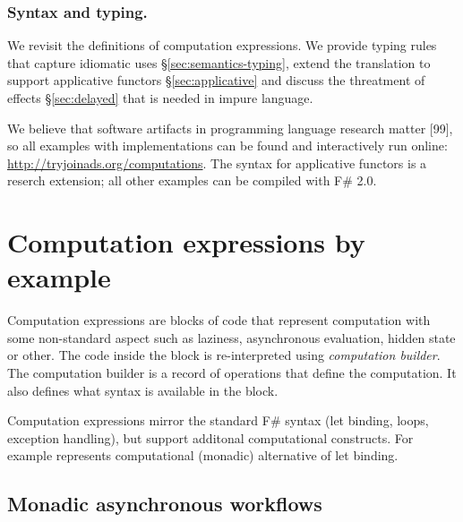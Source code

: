 \documentclass[runningheads,a4paper]{llncs}
\begin{document}
\vspace{-1em}
\subsubsection{Syntax and typing.} We revisit the definitions of computation expressions. We provide
typing rules that capture idiomatic uses \S\ref{sec:semantics-typing}, extend the translation
to support applicative functors \S\ref{sec:applicative} and discuss the threatment of effects
\S\ref{sec:delayed} that is needed in impure language.

\vspace{1em}
\noindent
We believe that software artifacts in programming language research matter [99], so all examples 
with implementations can be found and interactively run online: \url{http://tryjoinads.org/computations}. 
The syntax for applicative functors is a reserch extension; all other examples can be 
compiled with F\# 2.0.

\section{Computation expressions by example}
\label{sec:intro}

Computation expressions are blocks of code that represent computation with some non-standard 
aspect such as laziness, asynchronous evaluation, hidden state or other. The code inside the
block is re-interpreted using \emph{computation builder}. The computation builder is a record 
of operations that define the computation. It also defines what syntax is available in the block.

Computation expressions mirror the standard F\# syntax (let binding, loops, exception handling),
but support additonal computational constructs. For example  represents computational 
(monadic) alternative of let binding.

\subsection{Monadic asynchronous workflows}
\label{sec:intro-async}
\end{document}
